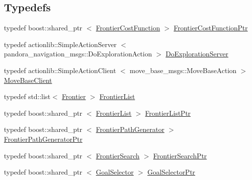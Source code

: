 \subsection*{\-Typedefs}
\begin{DoxyCompactItemize}
\item 
typedef boost\-::shared\-\_\-ptr\*
$<$ \hyperlink{classpandora__exploration_1_1_frontier_cost_function}{\-Frontier\-Cost\-Function} $>$ \hyperlink{namespacepandora__exploration_ae01d77b922afd1af6a1db394d19d9cde}{\-Frontier\-Cost\-Function\-Ptr}
\item 
typedef \*
actionlib\-::\-Simple\-Action\-Server\*
$<$ pandora\-\_\-navigation\-\_\-msgs\-::\-Do\-Exploration\-Action $>$ \hyperlink{namespacepandora__exploration_a897420c85c91df49559a24474430f015}{\-Do\-Exploration\-Server}
\item 
typedef \*
actionlib\-::\-Simple\-Action\-Client\*
$<$ move\-\_\-base\-\_\-msgs\-::\-Move\-Base\-Action $>$ \hyperlink{namespacepandora__exploration_afe30b32b280f4f0ee5441cd7203270e7}{\-Move\-Base\-Client}
\item 
typedef std\-::list$<$ \hyperlink{classpandora__exploration_1_1_frontier}{\-Frontier} $>$ \hyperlink{namespacepandora__exploration_ac53a7b62c5b3973ce061b6e233945cda}{\-Frontier\-List}
\item 
typedef boost\-::shared\-\_\-ptr\*
$<$ \hyperlink{namespacepandora__exploration_ac53a7b62c5b3973ce061b6e233945cda}{\-Frontier\-List} $>$ \hyperlink{namespacepandora__exploration_a6f3b1959fca391e2ef3ac46b6e96be7a}{\-Frontier\-List\-Ptr}
\item 
typedef boost\-::shared\-\_\-ptr\*
$<$ \hyperlink{classpandora__exploration_1_1_frontier_path_generator}{\-Frontier\-Path\-Generator} $>$ \hyperlink{namespacepandora__exploration_abbf4ad7ffa7938b40818f00f8b3615ed}{\-Frontier\-Path\-Generator\-Ptr}
\item 
typedef boost\-::shared\-\_\-ptr\*
$<$ \hyperlink{classpandora__exploration_1_1_frontier_search}{\-Frontier\-Search} $>$ \hyperlink{namespacepandora__exploration_a64e0f8af651e5cb4686da16f76e6f34c}{\-Frontier\-Search\-Ptr}
\item 
typedef boost\-::shared\-\_\-ptr\*
$<$ \hyperlink{classpandora__exploration_1_1_goal_selector}{\-Goal\-Selector} $>$ \hyperlink{namespacepandora__exploration_a5fbf474bbabd4fc908e71b1674797edd}{\-Goal\-Selector\-Ptr}
\end{DoxyCompactItemize}
